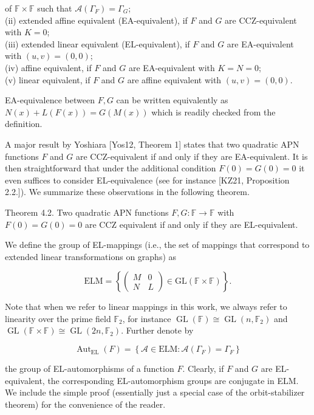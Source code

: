 \documentclass[10pt]{article}
\begin{document}
of $\mathbb{F} \times \mathbb{F}$ such that $\mathcal{A}\left(\Gamma_{F}\right)=\Gamma_{G}$;\\
(ii) extended affine equivalent (EA-equivalent), if $F$ and $G$ are CCZ-equivalent with $K=0$;\\
(iii) extended linear equivalent (EL-equivalent), if $F$ and $G$ are EA-equivalent with $(u, v)=(0,0)$;\\
(iv) affine equivalent, if $F$ and $G$ are EA-equivalent with $K=N=0$;\\
(v) linear equivalent, if $F$ and $G$ are affine equivalent with $(u, v)=(0,0)$.

EA-equivalence between $F, G$ can be written equivalently as $N(x)+L(F(x))=G(M(x))$ which is readily checked from the definition.

A major result by Yoshiara [Yos12, Theorem 1] states that two quadratic APN functions $F$ and $G$ are CCZ-equivalent if and only if they are EA-equivalent. It is then straightforward that under the additional condition $F(0)=G(0)=0$ it even suffices to consider EL-equivalence (see for instance [KZ21, Proposition 2.2.]). We summarize these observations in the following theorem.

Theorem 4.2. Two quadratic APN functions $F, G: \mathbb{F} \rightarrow \mathbb{F}$ with $F(0)=G(0)=0$ are CCZ equivalent if and only if they are EL-equivalent.

We define the group of EL-mappings (i.e., the set of mappings that correspond to extended linear transformations on graphs) as

$$
\mathrm{ELM}=\left\{\left(\begin{array}{cc}
M & 0 \\
N & L
\end{array}\right) \in \mathrm{GL}(\mathbb{F} \times \mathbb{F})\right\} .
$$

Note that when we refer to linear mappings in this work, we always refer to linearity over the prime field $\mathbb{F}_{2}$, for instance $\operatorname{GL}(\mathbb{F}) \cong \operatorname{GL}\left(n, \mathbb{F}_{2}\right)$ and $\operatorname{GL}(\mathbb{F} \times \mathbb{F}) \cong \operatorname{GL}\left(2 n, \mathbb{F}_{2}\right)$. Further denote by

$$
\operatorname{Aut}_{\mathrm{EL}}(F)=\left\{\mathcal{A} \in \mathrm{ELM}: \mathcal{A}\left(\Gamma_{F}\right)=\Gamma_{F}\right\}
$$

the group of EL-automorphisms of a function $F$. Clearly, if $F$ and $G$ are EL-equivalent, the corresponding EL-automorphism groups are conjugate in ELM. We include the simple proof (essentially just a special case of the orbit-stabilizer theorem) for the convenience of the reader.
\end{document}
